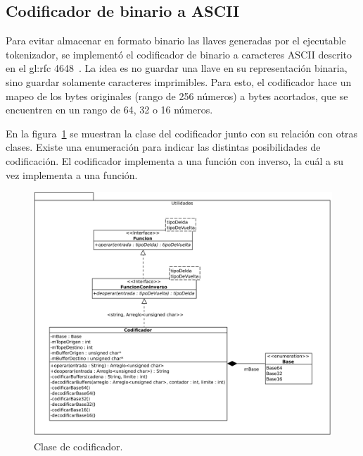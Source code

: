%
%
%

\subsection{Codificador de binario a ASCII}

Para evitar almacenar en formato binario las llaves generadas por el ejecutable
tokenizador, se implementó el codificador de binario a caracteres ASCII descrito
en el \gls{gl:rfc} 4648~\cite{DBLP:journals/rfc/rfc4648}. La idea es no guardar
una llave en su representación binaria, sino guardar solamente caracteres
imprimibles. Para esto, el codificador hace un mapeo de los bytes originales
(rango de 256 números) a bytes acortados, que se encuentren en un rango de 64,
32 o 16 números.

En la figura~\ref{clases_codificador} se muestran la clase del codificador junto
con su relación con otras clases. Existe una enumeración para indicar las
distintas posibilidades de codificación. El codificador implementa a una función
con inverso, la cuál a su vez implementa a una función.

\begin{figure}
  \begin{center}
    \includegraphics[width=0.7\linewidth]{diagramas/codificador.png}
    \caption{Clase de codificador.}
    \label{clases_codificador}
  \end{center}
\end{figure}
